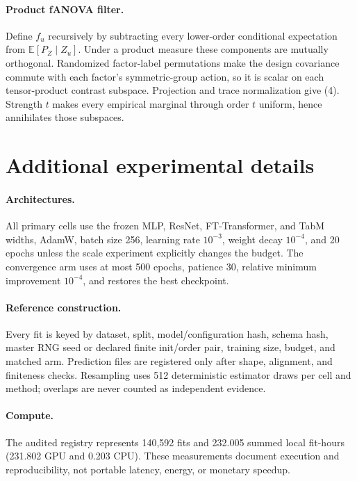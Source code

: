 \documentclass{article}
\newcommand{\E}{\mathbb{E}}
\begin{document}
\paragraph{Product fANOVA filter.}
Define $f_u$ recursively by subtracting every lower-order conditional
expectation from $\E[P_Z\mid Z_u]$. Under a product measure these components
are mutually orthogonal. Randomized factor-label permutations make the design
covariance commute with each factor's symmetric-group action, so it is scalar
on each tensor-product contrast subspace. Projection and trace normalization
give (4). Strength $t$ makes every empirical marginal through order $t$
uniform, hence annihilates those subspaces.

\section{Additional experimental details}

\paragraph{Architectures.}
All primary cells use the frozen MLP, ResNet, FT-Transformer, and TabM widths,
AdamW, batch size 256, learning rate $10^{-3}$, weight decay $10^{-4}$, and
20 epochs unless the scale experiment explicitly changes the budget. The
convergence arm uses at most 500 epochs, patience 30, relative minimum
improvement $10^{-4}$, and restores the best checkpoint.

\paragraph{Reference construction.}
Every fit is keyed by dataset, split, model/configuration hash, schema hash,
master RNG seed or declared finite init/order pair, training size, budget, and
matched arm. Prediction files are registered only after shape, alignment, and
finiteness checks. Resampling uses 512 deterministic estimator draws per cell
and method; overlaps are never counted as independent evidence.

\paragraph{Compute.}
The audited registry represents 140,592 fits and 232.005 summed local fit-hours
(231.802 GPU and 0.203 CPU). These measurements document execution and
reproducibility, not portable latency, energy, or monetary speedup.
\end{document}
